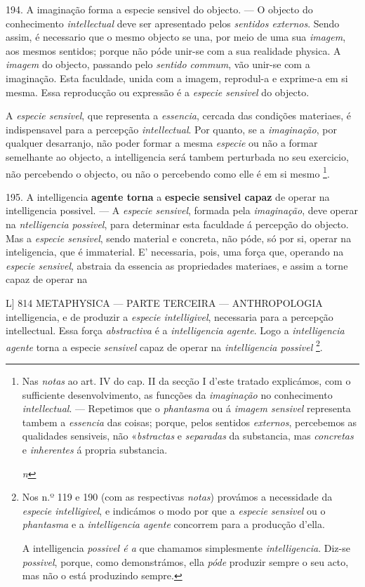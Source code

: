 194. A imaginação forma a especie sensivel do objecto. --- O objecto do conhecimento \emph{intellectual} deve ser apresentado pelos \emph{sentidos externos}. Sendo assim, é necessario que o mesmo objecto se una, por meio de uma sua \emph{imagem}, aos mesmos sentidos; porque não póde unir-se com a sua realidade physica. A \emph{imagem} do objecto, passando pelo \emph{sentido commum}, vão unir-se com a imaginação. Esta faculdade, unida com a imagem, reprodul-a e exprime-a em si mesma. Essa reproducção ou expressão é a \emph{especie sensivel} do objecto.

A \emph{especie sensivel}, que representa a \emph{essencia}, cercada das condições materiaes, é indispensavel para a percepção \emph{intellectual}. Por quanto, se a \emph{imaginação}, por qualquer desarranjo, não poder formar a mesma \emph{especie} ou não a formar semelhante ao objecto, a intelligencia será tambem perturbada no seu exercicio, não percebendo o objecto, ou não o percebendo como elle é em si mesmo \footnote{Nas \emph{notas} ao art. IV do cap. II da secção I d'este tratado explicámos, com o sufficiente desenvolvimento, as funcções da \emph{imaginação} no conhecimento \emph{intellectual}. --- Repetimos que o \emph{phantasma} ou á \emph{imagem sensivel} representa tambem a \emph{essencia} das coisas; porque, pelos sentidos \emph{externos}, percebemos as qualidades sensiveis, não «\emph{bstractas} e \emph{separadas} da substancia, mas \emph{concretas} e \emph{inherentes} á propria substancia.\par \emph{n}}.

195. A intelligencia \textbf{agente torna} a \textbf{especie sensivel capaz} de operar na intelligencia possivel. --- A \emph{especie sensivel}, formada pela \emph{imaginação}, deve operar na \emph{ntelligencia possivel}, para determinar esta faculdade á percepção do objecto. Mas a \emph{especie sensivel}, sendo material e concreta, não póde, só por si, operar na inteligencia, que é immaterial. E' necessaria, pois, uma força que, operando na \emph{especie sensivel}, abstraia da essencia as propriedades materiaes, e assim a torne capaz de operar na

L] 814 METAPHYSICA --- PARTE TERCEIRA --- ANTHROPOLOGIA intelligencia, e de produzir a \emph{especie intelligivel}, necessaria para a percepção intellectual. Essa força \emph{abstractiva} é a \emph{intelligencia agente}. Logo a \emph{intelligencia agente} torna a especie \emph{sensivel} capaz de operar na \emph{intelligencia possivel} \footnote{Nos n.º 119 e 190 (com as respectivas \emph{notas}) provámos a necessidade da \emph{especie intelligivel}, e indicámos o modo por que a \emph{especie sensivel} ou o \emph{phantasma} e a \emph{intelligencia agente} concorrem para a producção d'ella.\par A intelligencia \emph{possivel é a} que chamamos simplesmente \emph{intelligencia}. Diz-se \emph{possivel}, porque, como demonstrámos, ella \emph{póde} produzir sempre o seu acto, mas não o está produzindo sempre.}.


